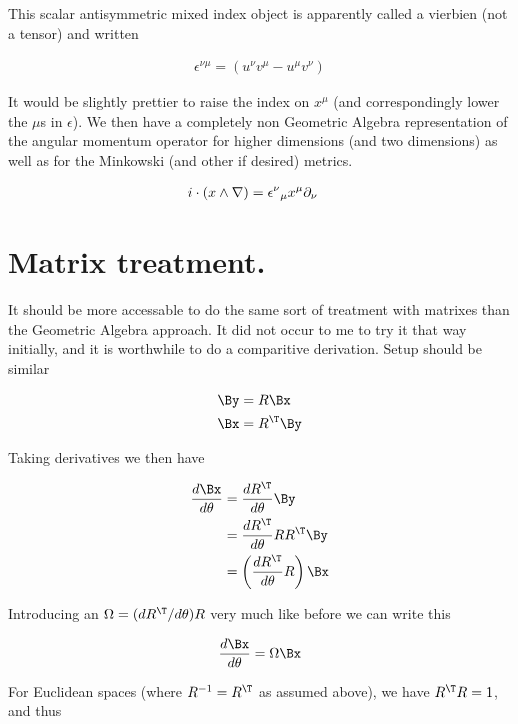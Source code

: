 This scalar antisymmetric mixed index object is apparently called a vierbien (not a tensor) and written 

\begin{align}\label{eqn:rotationGen:foo43}
\epsilon^{\nu\mu} = (u^\nu v^\mu - u^\mu v^\nu) 
\end{align}

It would be slightly prettier to raise the index on $x^\mu$ (and correspondingly lower the $\mu$s in $\epsilon$).  We then have a completely non Geometric Algebra representation of the angular momentum operator for higher dimensions (and two dimensions) as well as for the Minkowski (and other if desired) metrics.

\begin{align}\label{eqn:rotationGen:foo44}
i \cdot (x \wedge \nabla) 
&=
{\epsilon^{\nu}}_\mu x^\mu \partial_\nu 
\end{align}

\section{Matrix treatment.}

It should be more accessable to do the same sort of treatment with matrixes than the Geometric Algebra approach.  It did not occur to me to try it that way initially, and it is worthwhile to do a comparitive derivation.  Setup should be similar

\begin{align}\label{eqn:rotationGen:boo1}
\By &= R \Bx \\
\Bx &= R^\T \By 
\end{align}

Taking derivatives we then have

\begin{align*}
\frac{d \Bx}{d\theta}
&= \frac{d R^\T}{d\theta} \By \\
&= \frac{d R^\T}{d\theta} R R^\T \By \\
&= \left( \frac{d R^\T}{d\theta} R \right) \Bx \\
\end{align*}

Introducing an $\Omega = (dR^\T/d\theta) R$ very much like before we can write this

\begin{align}\label{eqn:rotationGen:boo2}
\frac{d \Bx}{d\theta} = \Omega \Bx
\end{align}

For Euclidean spaces (where $R^{-1} = R^\T$ as assumed above), we have $R^\T R = 1$, and thus

